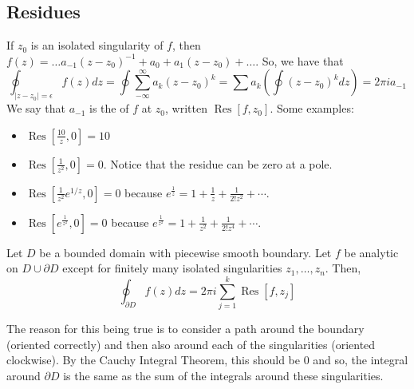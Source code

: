 \documentclass[11pt,leqno,oneside]{amsart}
\numberwithin{thm}{section}
\newcommand{\Res}{\operatorname{Res}}
\begin{document}
  \subsection*{Residues}
  If $z_0$ is an isolated singularity of $f$, then $f(z) = \ldots
  a_{-1}(z-z_0)^{-1} + a_0 + a_1(z-z_0)+\ldots$. So, we have that \[
    \oint_{|z-z_0| = \epsilon} f(z)dz = \oint \sum_{-\infty}^{\infty}
    a_k(z-z_0)^k = \sum a_k
    \left(
      \oint (z-z_0)^kdz
    \right) = 2\pi i a_{-1}
  \]
  We say that $a_{-1}$ is the  of $f$ at $z_0$, written
  $\Res[f,z_0]$. Some examples:
  \begin{example}
    \begin{itemize}
    \item $\Res[\frac{10}{z},0] = 10$
    \item $\Res[\frac{1}{z^2},0] = 0$. Notice that the residue can be
      zero at a pole.
    \item $\Res[\frac{1}{z^2}e^{1/z},0] = 0$ because $e^{\frac{1}{z}}
      = 1 + \frac{1}{z} + \frac{1}{2!z^2} + \cdots$.
    \item $\Res[e^{\frac{1}{z^2}},0] = 0$ because $e^{\frac{1}{z^2}} =
      1+ \frac{1}{z^2} + \frac{1}{2! z^4} + \cdots$.
    \end{itemize}
  \end{example}
  \begin{thm}
    Let $D$ be a bounded domain with piecewise smooth boundary. Let
    $f$ be analytic on $D \cup \partial D$ except for finitely many
    isolated singularities $z_1, \ldots, z_n$. Then, \[
      \oint_{\partial D} f(z)dz = 2 \pi i \sum_{j=1}^k \Res[f,z_j]
    \]
  \end{thm}
  The reason for this being true is to consider a path around the
  boundary (oriented correctly) and then also around each of the
  singularities (oriented clockwise). By the
  Cauchy Integral Theorem, this should be 0 and so, the integral
  around $\partial D$ is the same as the sum of the integrals around
  these singularities.
\end{document}

